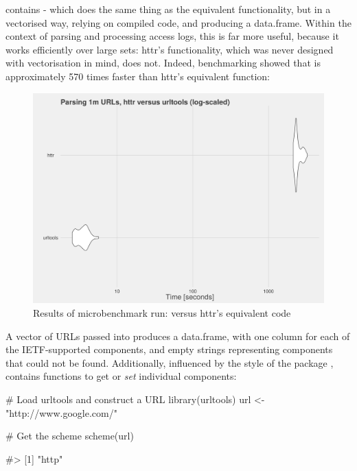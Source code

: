  contains  - which does the same thing as
the equivalent  functionality, but in a vectorised way,
relying on compiled code, and producing a data.frame. Within the context
of parsing and processing access logs, this is far more useful, because
it works efficiently over large sets: httr's functionality, which was
never designed with vectorisation in mind, does not. Indeed,
benchmarking showed that  is approximately 570 times
faster than httr's equivalent function:

\begin{figure}[h]
    \centering
    \includegraphics[scale=0.4]{parsing_benchmarks}
    \caption{Results of microbenchmark run:  versus httr's equivalent code}
\end{figure}

\newpage

A vector of URLs passed into  produces a data.frame,
with one column for each of the IETF-supported components, and empty
strings representing components that could not be found. Additionally,
influenced by the style of the  package
\citep{lubridate},  contains functions to get or
\emph{set} individual components:

\begin{Schunk}
\begin{Sinput}
# Load urltools and construct a URL
library(urltools)
url <- "http://www.google.com/"

# Get the scheme
scheme(url)
\end{Sinput}
\begin{Soutput}
#> [1] "http"
\end{Soutput}
\end{Schunk}

